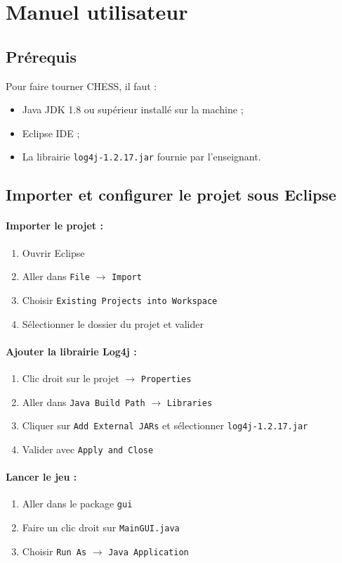 \newpage
\section{Manuel utilisateur}
\label{sec:manuel}
\subsection{Prérequis}
Pour faire tourner CHESS, il faut :
\begin{itemize}
\item Java JDK 1.8 ou supérieur installé sur la machine ;
\item Eclipse IDE ;
\item La librairie \texttt{log4j-1.2.17.jar} fournie par l'enseignant.
\end{itemize}
\subsection{Importer et configurer le projet sous Eclipse}
\paragraph{Importer le projet :}
\begin{enumerate}
\item Ouvrir Eclipse
\item Aller dans \texttt{File} $\rightarrow$ \texttt{Import}
\item Choisir \texttt{Existing Projects into Workspace}
\item Sélectionner le dossier du projet et valider
\end{enumerate}
\paragraph{Ajouter la librairie Log4j :}
\begin{enumerate}
\item Clic droit sur le projet $\rightarrow$ \texttt{Properties}
\item Aller dans \texttt{Java Build Path} $\rightarrow$ \texttt{Libraries}
\item Cliquer sur \texttt{Add External JARs} et sélectionner \texttt{log4j-1.2.17.jar}
\item Valider avec \texttt{Apply and Close}
\end{enumerate}
\paragraph{Lancer le jeu :}
\begin{enumerate}
\item Aller dans le package \texttt{gui}
\item Faire un clic droit sur \texttt{MainGUI.java}
\item Choisir \texttt{Run As} $\rightarrow$ \texttt{Java Application}
\end{enumerate}
